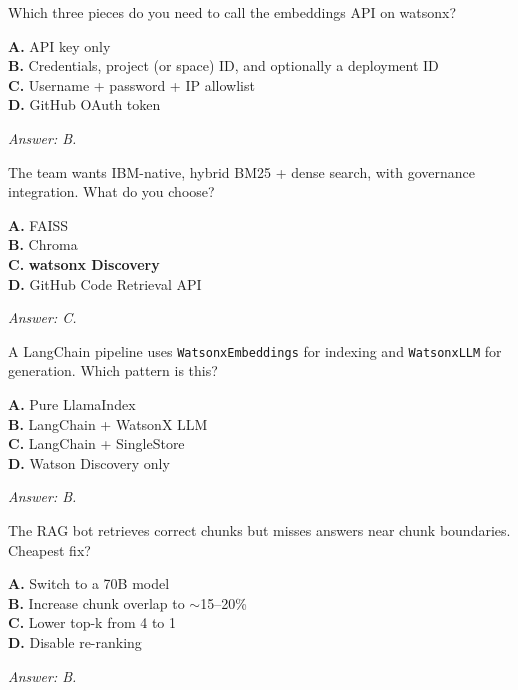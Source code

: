\begin{practicebox}[title=\textbf{Q4.2 --- Prereqs}]
Which three pieces do you need to call the embeddings API on watsonx?

\textbf{A.} API key only\\
\textbf{B.} Credentials, project (or space) ID, and optionally a deployment ID\\
\textbf{C.} Username + password + IP allowlist\\
\textbf{D.} GitHub OAuth token

\vspace{0.2cm}\textit{Answer: B.}
\end{practicebox}

\begin{practicebox}[title=\textbf{Q4.3 --- Retriever pick}]
The team wants IBM-native, hybrid BM25 + dense search, with governance integration. What do you choose?

\textbf{A.} FAISS\\
\textbf{B.} Chroma\\
\textbf{C.} \textbf{watsonx Discovery}\\
\textbf{D.} GitHub Code Retrieval API

\vspace{0.2cm}\textit{Answer: C.}
\end{practicebox}

\begin{practicebox}[title=\textbf{Q4.4 --- Implementation pattern}]
A LangChain pipeline uses \texttt{WatsonxEmbeddings} for indexing and \texttt{WatsonxLLM} for generation. Which pattern is this?

\textbf{A.} Pure LlamaIndex\\
\textbf{B.} LangChain + WatsonX LLM\\
\textbf{C.} LangChain + SingleStore\\
\textbf{D.} Watson Discovery only

\vspace{0.2cm}\textit{Answer: B.}
\end{practicebox}

\begin{practicebox}[title=\textbf{Q4.5 --- Chunking}]
The RAG bot retrieves correct chunks but misses answers near chunk boundaries. Cheapest fix?

\textbf{A.} Switch to a 70B model\\
\textbf{B.} Increase chunk overlap to $\sim$15--20\%\\
\textbf{C.} Lower top-k from 4 to 1\\
\textbf{D.} Disable re-ranking

\vspace{0.2cm}\textit{Answer: B.}
\end{practicebox}

